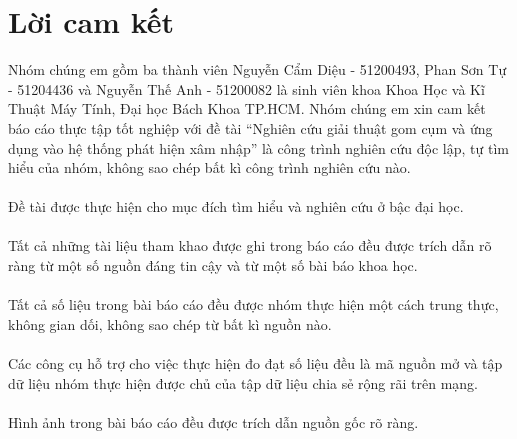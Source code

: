 \section*{Lời cam kết}
\thispagestyle{plain} 
Nhóm chúng em gồm ba thành viên Nguyễn Cẩm Diệu - 51200493, Phan Sơn Tự -
51204436 và Nguyễn Thế Anh - 51200082 là sinh viên khoa Khoa Học và Kĩ Thuật Máy Tính, Đại học Bách Khoa TP.HCM. Nhóm chúng em xin cam kết báo cáo thực tập tốt nghiệp với đề tài “Nghiên cứu giải thuật gom cụm và ứng dụng vào hệ
thống phát hiện xâm nhập” là công trình nghiên cứu độc lập, tự tìm hiểu của
nhóm, không sao chép bất kì công trình nghiên cứu nào.\\\\
Đề tài được thực hiện
cho mục đích tìm hiểu và nghiên cứu ở bậc đại học.\\\\
Tất cả những tài liệu tham khao được ghi trong báo cáo đều được trích dẫn rõ
ràng từ một số nguồn đáng tin cậy và từ một số bài báo khoa học.\\\\
Tất cả số liệu trong bài báo cáo đều được nhóm thực hiện một cách trung thực,
không gian dối, không sao chép từ bất kì nguồn nào.\\\\
Các công cụ hỗ trợ cho việc thực hiện đo đạt số liệu đều là mã nguồn mở và tập
dữ liệu nhóm thực hiện được chủ của tập dữ liệu chia sẻ rộng rãi trên mạng.\\\\
Hình ảnh trong bài báo cáo đều được trích dẫn nguồn gốc rõ ràng.
\pagebreak

